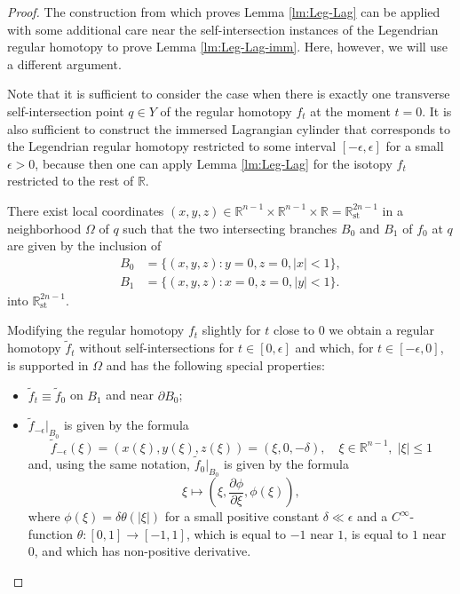 \documentclass[reqno,11pt]{amsart}
\numberwithin{equation}{section}
\theoremstyle{my}
\theoremstyle{my}
\theoremstyle{your}
\newcommand{\R}{\mathbb{R}}
\newcommand{\st}{\mathrm{st}}
\newcommand{\p}{\partial }
\newcommand{\eps}{\epsilon}
\newcommand{\wt}{\widetilde}
\begin{document}
\begin{proof}
The construction from \cite[Lemma 4.2.5]{ELIGRO-findim} which proves Lemma \ref{lm:Leg-Lag} can be applied with some additional care near the self-intersection instances of the Legendrian regular homotopy to prove Lemma \ref{lm:Leg-Lag-imm}. Here, however,  we will use a different argument.

Note that it is sufficient to consider the case when there is exactly one transverse self-intersection  point $q\in Y$ of the regular homotopy $f_t$ at the  moment $t=0 $. It is also sufficient to construct the immersed Lagrangian cylinder that corresponds to the Legendrian regular homotopy restricted to some interval $[ -\eps, \eps]$ for a small $\eps>0$, because then  one can apply Lemma \ref{lm:Leg-Lag} for the isotopy $f_t$ restricted to the rest of $\R$.

There exist local coordinates $(x,y,z)\in\R^{n-1}\times\R^{n-1}\times\R=\R^{2n-1}_{\st}$  in a neighborhood  $\Omega$ of $q$ such that the two intersecting branches $B_0$ and $B_1$ of $f_0$ at $q$ are given by the inclusion of 
\begin{align}
B_0&=\{(x,y,z)\colon y=0, z=0, |x|< 1\},\\
B_1&=\{(x,y,z)\colon x=0, z=0, |y|< 1\}.
\end{align}   
into $\R^{2n-1}_{\st}$. 

Modifying the regular homotopy $f_t$ slightly for $t$ close to $0$ we obtain a regular homotopy $\wt f_t$ without self-intersections for $t\in[0, \eps]$ and which, for $t\in[-\eps,0]$, is supported in $\Omega$ and has the following special properties:
\begin{itemize}
\item $\wt f_t \equiv \wt f_0 $ on $B_1$ and near $\p B_0$;
\item $\wt f_{-\eps}|_{B_0}$ is given by the
formula 
$$
\wt f_{-\eps}(\xi)=(x(\xi),y(\xi),z(\xi))=(\xi,0,-\delta),\quad \xi\in\R^{n-1},\;|\xi|\le1
$$
and, using the same notation, $\wt f_{0}|_{B_0}$ is given by the formula 
$$
\xi\mapsto\left(\xi,\frac{\p\phi}{\p \xi },\phi(\xi)\right),
$$ 
where  $\phi(\xi)=\delta\theta(|\xi|)$ for a small positive constant $\delta\ll\eps$ and a  $C^\infty$-function  $\theta\colon [0,1]\to[-1,1]$, which is equal to $-1$ near $1$, is equal to $1$ near $0$, and which has non-positive derivative.
\end{itemize}


\end{proof}
\end{document}
